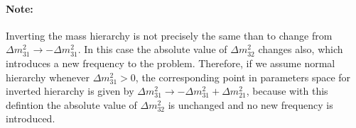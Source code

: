 \label{mass_ordering}
\paragraph{Note:} Inverting the mass hierarchy is not
precisely the same than to change from $\Delta m^2_{31}
\rightarrow -\Delta m^2_{31}$.
In this case the absolute value of $\Delta m^2_{32}$ changes also, which
introduces a new frequency to the problem. Therefore, if we assume
normal hierarchy  whenever $\Delta m^2_{31}>0$, the corresponding
point in parameters space for inverted hierarchy is given by $\Delta 
m^2_{31}\rightarrow - \Delta m^2_{31} + \Delta m^2_{21}$, because
with this defintion the absolute value of  $\Delta m^2_{32}$ is unchanged
and no new frequency is introduced.\\



